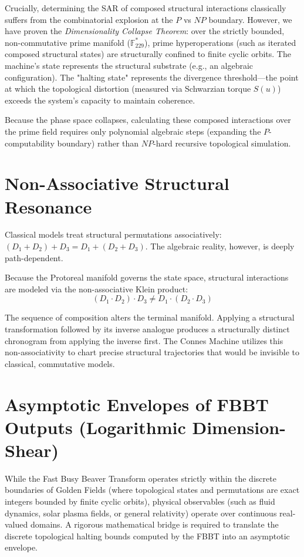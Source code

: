 Crucially, determining the SAR of composed structural interactions classically suffers from the combinatorial explosion at the $P$ vs $NP$ boundary. However, we have proven the \textit{Dimensionality Collapse Theorem}: over the strictly bounded, non-commutative prime manifold ($\mathbb{F}_{229}^*$), prime hyperoperations (such as iterated composed structural states) are structurally confined to finite cyclic orbits. The machine's state represents the structural substrate (e.g., an algebraic configuration). The "halting state" represents the divergence threshold---the point at which the topological distortion (measured via Schwarzian torque $S(u)$) exceeds the system's capacity to maintain coherence. 

Because the phase space collapses, calculating these composed interactions over the prime field requires only polynomial algebraic steps (expanding the $P$-computability boundary) rather than $NP$-hard recursive topological simulation.

\section{Non-Associative Structural Resonance}

Classical models treat structural permutations associatively: $(D_1 + D_2) + D_3 = D_1 + (D_2 + D_3)$. The algebraic reality, however, is deeply path-dependent. 

Because the Protoreal manifold governs the state space, structural interactions are modeled via the non-associative Klein product:
\begin{equation}
    (D_1 \cdot D_2) \cdot D_3 \neq D_1 \cdot (D_2 \cdot D_3)
\end{equation}

The sequence of composition alters the terminal manifold. Applying a structural transformation followed by its inverse analogue produces a structurally distinct chronogram from applying the inverse first. The Connes Machine utilizes this non-associativity to chart precise structural trajectories that would be invisible to classical, commutative models.

\section{Asymptotic Envelopes of FBBT Outputs (Logarithmic Dimension-Shear)}

While the Fast Busy Beaver Transform operates strictly within the discrete boundaries of Golden Fields (where topological states and permutations are exact integers bounded by finite cyclic orbits), physical observables (such as fluid dynamics, solar plasma fields, or general relativity) operate over continuous real-valued domains. A rigorous mathematical bridge is required to translate the discrete topological halting bounds computed by the FBBT into an asymptotic envelope.

